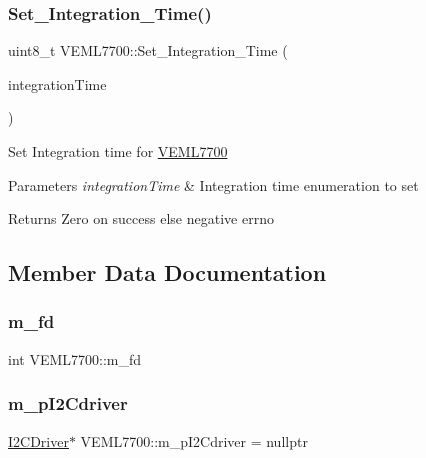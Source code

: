 \subsubsection{\texorpdfstring{Set\+\_\+\+Integration\+\_\+\+Time()}{Set\_Integration\_Time()}}
{\footnotesize\ttfamily uint8\+\_\+t V\+E\+M\+L7700\+::\+Set\+\_\+\+Integration\+\_\+\+Time (\begin{DoxyParamCaption}\item[{\hyperlink{classVEML7700_a82e8b8f9960d8f80bc31dcfe7133ad6e}{A\+L\+S\+\_\+\+I\+N\+T\+E\+G\+R\+T\+A\+T\+I\+O\+N\+\_\+\+T\+I\+M\+E\+\_\+T}}]{integration\+Time }\end{DoxyParamCaption})}

Set Integration time for \hyperlink{classVEML7700}{V\+E\+M\+L7700}


\begin{DoxyParams}{Parameters}
{\em integration\+Time} & Integration time enumeration to set\\
\hline
\end{DoxyParams}
\begin{DoxyReturn}{Returns}
Zero on success else negative errno 
\end{DoxyReturn}


\subsection{Member Data Documentation}
\mbox{\label{classVEML7700_ae6d0418ab65f7fdfb21079d8637334af}} 
\subsubsection{\texorpdfstring{m\+\_\+fd}{m\_fd}}
{\footnotesize\ttfamily int V\+E\+M\+L7700\+::m\+\_\+fd\hspace{0.3cm}{\ttfamily [private]}}

\mbox{\label{classVEML7700_a06777141dab95a6244cc75e97a66f238}} 
\subsubsection{\texorpdfstring{m\+\_\+p\+I2\+Cdriver}{m\_pI2Cdriver}}
{\footnotesize\ttfamily \hyperlink{classI2CDriver}{I2\+C\+Driver}$\ast$ V\+E\+M\+L7700\+::m\+\_\+p\+I2\+Cdriver = nullptr\hspace{0.3cm}{\ttfamily [private]}}

